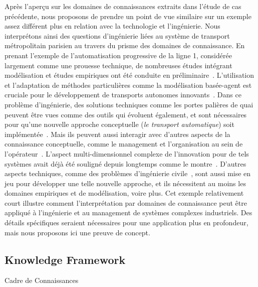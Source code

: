{Après l'aperçu sur les domaines de connaissances extraits dans l'étude de cas précédente, nous proposons de prendre un point de vue similaire sur un exemple assez différent plus en relation avec la technologie et l'ingénierie. Nous interprétons ainsi des questions d'ingénierie liées au système de transport métropolitain parisien au travers du prisme des domaines de connaissance. En prenant l'exemple de l'automatisation progressive de la ligne 1, considérée largement comme une prouesse technique, de nombreuses études intégrant modélisation et études empiriques ont été conduite en préliminaire~\cite{belmonte2008automatisation}. L'utilisation et l'adaptation de méthodes particulières comme la modélisation basée-agent est cruciale pour le développement de transports autonomes innovants~\cite{balbo2016positionnement}. Dans ce problème d'ingénierie, des solutions techniques comme les portes palières de quai peuvent être vues comme des outils qui évoluent également, et sont nécessaires pour qu'une nouvelle approche conceptuelle (\emph{le transport automatique}) soit implémentée~\cite{foot2005faut}. Mais ils peuvent aussi interagir avec d'autres aspects de la connaissance conceptuelle, comme le management et l'organisation au sein de l'opérateur~\cite{foot1994ratp}. L'aspect multi-dimensionnel complexe de l'innovation pour de tels systèmes avait déjà été souligné depuis longtemps comme le montre~\cite{hatchuel1988stations}. D'autres aspects techniques, comme des problèmes d'ingénierie civile~\cite{moreno2016etude}, sont aussi mise en jeu pour développer une telle nouvelle approche, et ils nécessitent au moins les domaines empiriques et de modélisation, voire plus. Cet exemple relativement court illustre comment l'interprétation par domaines de connaissance peut être appliqué à l'ingénierie et au management de systèmes complexes industriels. Des détails spécifiques seraient nécessaires pour une application plus en profondeur, mais nous proposons ici une preuve de concept.
}



\subsection{Knowledge Framework}{Cadre de Connaissances}



